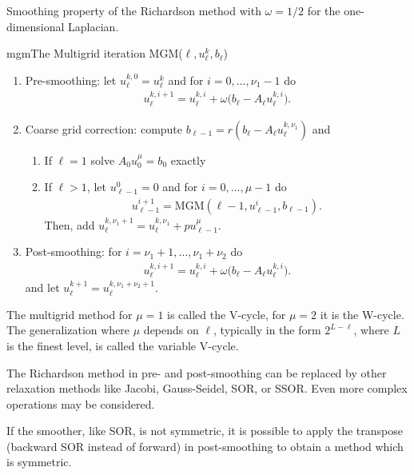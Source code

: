 \def\restrict{r}
\def\prolongate{p}
\begin{example}
  Smoothing property of the Richardson method with $\omega = 1/2$ for the one-dimensional Laplacian.
\end{example}
\begin{Algorithm*}{mgm}{The Multigrid iteration MGM($\ell, u_\ell^{k}, b_\ell$)}
  \begin{enumerate}
  \item Pre-smoothing: let $u_\ell^{k,0} = u_\ell^{k}$ and for
    $i=0,\dots,\nu_1-1$ do
    \begin{gather}
      u_\ell^{k,i+1} = u_\ell^{k,i}
      + \omega\bigl(b_\ell - A_\ell u_\ell^{k,i}\bigr).
    \end{gather}
  \item Coarse grid correction: compute
    $b_{\ell-1} = \restrict(b_\ell - A_\ell u_\ell^{k,\nu_1})$ and
    \begin{enumerate}
    \item If $\ell=1$ solve $A_0 u_0^{\mu} = b_0$ exactly
    \item If $\ell>1$, let $u_{\ell-1}^0 = 0$ and for $i=0,\dots,\mu-1$ do
      \begin{gather*}
        u_{\ell-1}^{i+1} = \text{MGM}(\ell-1, u_{\ell-1}^{i},b_{\ell-1}).
      \end{gather*}
      Then, add
      $u_\ell^{k,\nu_1+1} = u_\ell^{k,\nu_1} + \prolongate u_{\ell-1}^{\mu}$.
    \end{enumerate}
  \item Post-smoothing: for $i=\nu_1+1,\dots,\nu_1+\nu_2$ do
    \begin{gather}
      u_\ell^{k,i+1} = u_\ell^{k,i}
      + \omega\bigl(b_\ell - A_\ell u_\ell^{k,i}\bigr).
    \end{gather}
    and let
    $u_\ell^{k+1}=u_\ell^{k,\nu_1+\nu_2+1}$.
  \end{enumerate}
\end{Algorithm*}

\begin{remark}
  The multigrid method for $\mu=1$ is called the V-cycle, for $\mu=2$
  it is the W-cycle. The generalization where $\mu$ depends on $\ell$,
  typically in the form $2^{L-\ell}$, where $L$ is the finest level,
  is called the variable V-cycle.
\end{remark}

\begin{remark}
  The Richardson method in pre- and post-smoothing can be replaced by
  other relaxation methods like Jacobi, Gauss-Seidel, SOR, or
  SSOR. Even more complex operations may be considered.

  If the smoother, like SOR, is not symmetric, it is possible to apply
  the transpose (backward SOR instead of forward) in post-smoothing to
  obtain a method which is symmetric.
\end{remark}

